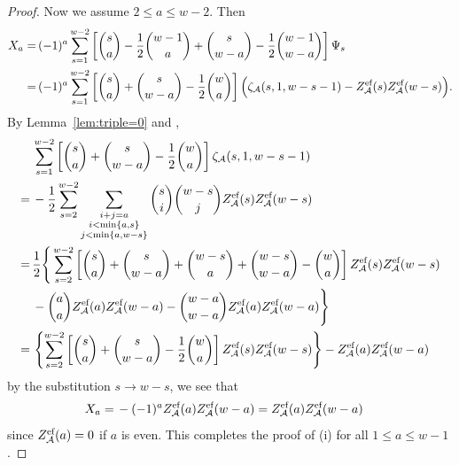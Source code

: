 \documentclass{article}
\newcommand{\calA}{\mathcal{A}}
\newcommand{\eff}{\text{\rm{ef}}}
\theoremstyle{plain}
\theoremstyle{definition}
\begin{document}
\begin{proof}
Now we assume $2\le a\le w-2$. Then
\begin{align*}
X_a=&\,   (-1)^a \sum_{s=1}^{w-2} \left[ \binom{s}{a}-\frac12\binom{w-1}{a}+\binom{s}{w-a}-\frac12\binom{w-1}{w-a}\right]\Psi_s\\
=&\,   (-1)^a \sum_{s=1}^{w-2} \left[ \binom{s}{a}+\binom{s}{w-a}-\frac12\binom{w}{a}\right] \Big(\zeta_\calA(s,1,w-s-1)-Z_\calA^\eff(s)Z_\calA^\eff(w-s)\Big).
\end{align*}
By Lemma~\ref{lem:triple=0} and \cite[Cor.~5.9]{BachmannRisan2026},
\begin{align*}
&\, \sum_{s=1}^{w-2} \left[ \binom{s}{a}+\binom{s}{w-a}-\frac12\binom{w}{a}\right]\zeta_\calA(s,1,w-s-1)\\
=&\, -\frac12  \sum_{s=2}^{w-2}  \sum_{\substack{i+j=a\\ i<\min\{a,s\}\\ j<\min\{a,w-s\} }} \binom{s}{i}\binom{w-s}{j}  Z_\calA^\eff(s)Z_\calA^\eff(w-s)\\
=&\, \frac12  \Bigg\{\sum_{s=2}^{w-2}  \left[\binom{s}{a}+\binom{s}{w-a}+\binom{w-s}{a}+\binom{w-s}{w-a} - \binom{w}{a}\right] Z_\calA^\eff(s)Z_\calA^\eff(w-s) \\
&\, - \binom{a}{a}Z_\calA^\eff(a)Z_\calA^\eff(w-a)-\binom{w-a}{w-a}Z_\calA^\eff(a)Z_\calA^\eff(w-a)\Bigg\}\\
=&\,  \left\{\sum_{s=2}^{w-2}  \left[\binom{s}{a}+\binom{s}{w-a} - \frac12 \binom{w}{a}\right] Z_\calA^\eff(s)Z_\calA^\eff(w-s)\right\}- Z_\calA^\eff(a)Z_\calA^\eff(w-a)
\end{align*}
by the substitution $s\to w-s$, we see that
\begin{align*}
X_a=& \, -(-1)^a Z_\calA^\eff(a)Z_\calA^\eff(w-a)=Z_\calA^\eff(a)Z_\calA^\eff(w-a)
\end{align*}
since $Z_\calA^\eff(a)=0$ if $a$ is even. This completes the proof of (i) for all $1\le a\le w-1$.


\end{proof}
\end{document}
